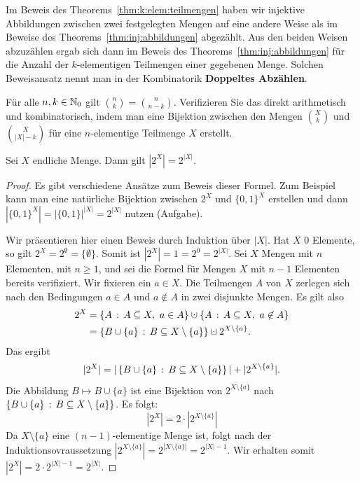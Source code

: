 \begin{bem} 
	Im Beweis des  Theorems~\ref{thm:k:elem:teilmengen} haben wir injektive Abbildungen zwischen zwei festgelegten Mengen auf eine andere Weise als im Beweise des Theorems~\ref{thm:inj:abbildungen} abgezählt. Aus den beiden Weisen abzuzählen ergab sich dann im Beweis des Theorems~\ref{thm:inj:abbildungen} für die Anzahl der $k$-elementigen Teilmengen einer gegebenen Menge. Solchen Beweisansatz nennt man in der Kombinatorik \textbf{Doppeltes Abzählen}. 
\end{bem} 

\begin{aufg}
	Für alle $n,k \in \mathbb{N}_0$ gilt $\binom{n}{k} = \binom{n}{n-k}$. Verifizieren Sie das direkt arithmetisch und kombinatorisch, indem man eine Bijektion zwischen 
	den Mengen $\binom{X}{k}$ und $\binom{X}{|X|-k}$ für eine $n$-elementige Teilmenge $X$ erstellt. 
\end{aufg} 


\begin{thm}
	Sei $X$ endliche Menge. Dann gilt $|2^X|=2^{|X|}$. 
\end{thm} 
\begin{proof} 
	Es gibt verschiedene Ansätze zum Beweis dieser Formel. Zum Beispiel kann man eine natürliche Bijektion zwischen  $2^X$ und $\{0,1\}^X$ erstellen und dann $|\{0,1\}^X| = |\{0,1\}|^{|X|} = 2^{|X|}$ nutzen (Aufgabe). 
	
	Wir präsentieren hier einen Beweis durch Induktion über $|X|$. Hat $X$ $0$ Elemente, so gilt $2^X = 2^\emptyset = \{\emptyset\}$. Somit ist $|2^X| = 1 = 2^0 = 2^{|X|}$. Sei $X$ Mengen mit $n$ Elementen, mit $n \ge 1$, und sei die Formel für Mengen $X$ mit $n-1$ Elementen bereits verifiziert. Wir fixieren ein $a \in X$. Die Teilmengen $A$ von $X$ zerlegen sich nach den Bedingungen $a \in A$ und $a \not\in A$ in zwei disjunkte Mengen. Es gilt also
	\begin{align*}
			2^X & = \setcond{A}{A \subseteq X, \ a \in A} \cupdot \setcond{A}{A \subseteq X, \ a \not\in A}
			\\ & = \setcond{B \cup \{a\}}{B \subseteq X \setminus \{a\}} \cupdot 2^{X \setminus \{a\}}. 
	\end{align*}
	Das ergibt
	\[
		|2^X| = |\left\{ B \cup \{a\} \,:\, B \subseteq X \setminus \{a\} \right\}| + | 2^{X \setminus \{a\}}|. 
	\]
	Die Abbildung $B \mapsto B \cup \{a\}$ ist eine Bijektion von $2^{X \setminus \{a\}}$ nach $\left\{ B \cup \{a\} \,:\, B \subseteq X \setminus \{a\} \right\}$. Es folgt: 
	\[
		|2^X| = 2 \cdot |2^{X \setminus \{a\}}|
	\]
	Da $X \setminus \{a\}$ eine $(n-1)$-elementige Menge ist, folgt nach der Induktionsovraussetzung $|2^{X \setminus \{a\}}| = 2^{|X \setminus \{a\}|} = 2^{|X|-1}$. Wir erhalten somit $|2^{X}| = 2 \cdot 2^{|X|-1} = 2^{|X|}$. 
\end{proof} 

